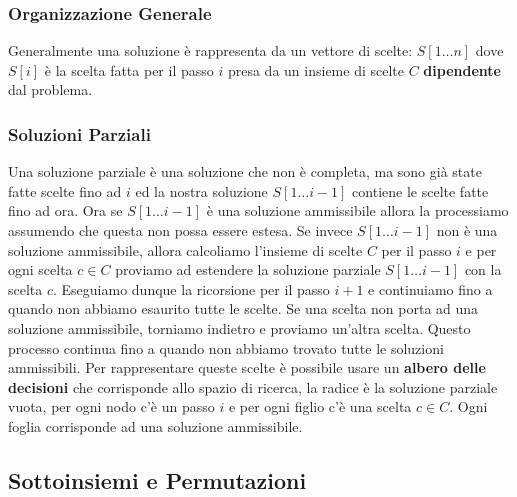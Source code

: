     \subsubsection{Organizzazione Generale}
        Generalmente una soluzione è rappresenta da un vettore di scelte: $S[1\dots n]$ dove $S[i]$ è la scelta fatta per il passo $i$ presa da un insieme di scelte $C$ \textbf{dipendente} dal problema.
    \subsubsection{Soluzioni Parziali}
        Una soluzione parziale è una soluzione che non è completa, ma sono già state fatte scelte fino ad $i$ ed la nostra soluzione $S[1\dots i-1]$ contiene le scelte fatte fino ad ora. Ora se $S[1\dots i-1]$ è una soluzione ammissibile allora la processiamo assumendo che questa non possa essere estesa. Se invece $S[1\dots i-1]$ non è una soluzione ammissibile, allora calcoliamo l'insieme di scelte $C$ per il passo $i$ e per ogni scelta $c \in C$ proviamo ad estendere la soluzione parziale $S[1\dots i-1]$ con la scelta $c$. Eseguiamo dunque la ricorsione per il passo $i+1$ e continuiamo fino a quando non abbiamo esaurito tutte le scelte. Se una scelta non porta ad una soluzione ammissibile, torniamo indietro e proviamo un'altra scelta. Questo processo continua fino a quando non abbiamo trovato tutte le soluzioni ammissibili.\newline
        Per rappresentare queste scelte è possibile usare un \textbf{albero delle decisioni} che corrisponde allo spazio di ricerca, la radice è la soluzione parziale vuota, per ogni nodo c'è un passo $i$ e per ogni figlio c'è una scelta $c \in C$. Ogni foglia corrisponde ad una soluzione ammissibile.
    \newpage
    \subsection{Sottoinsiemi e Permutazioni}
